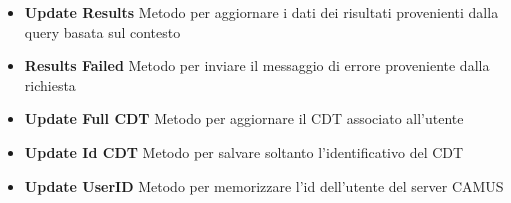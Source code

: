 \begin{itemize}
	\begin{itemize}
		\item \textbf{Update Results} Metodo per aggiornare i dati dei risultati provenienti dalla query basata sul contesto
		\item \textbf{Results Failed} Metodo per inviare il messaggio di errore proveniente dalla richiesta
		\item \textbf{Update Full CDT} Metodo per aggiornare il CDT associato all'utente
		\item \textbf{Update Id CDT} Metodo per salvare soltanto l'identificativo del CDT
		\item \textbf{Update UserID} Metodo per memorizzare l'id dell'utente del server CAMUS
	\end{itemize}
\end{itemize}


